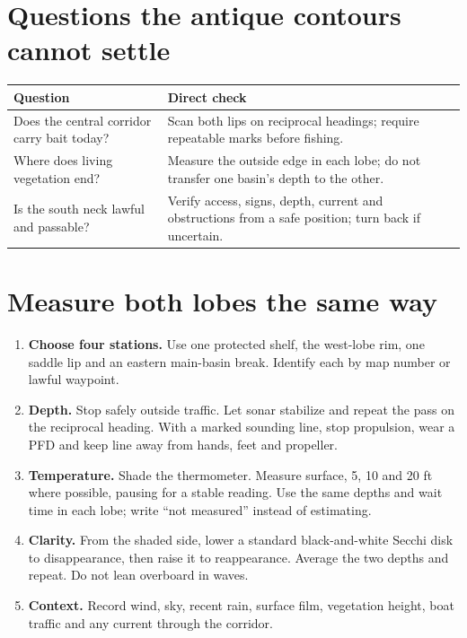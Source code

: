 \section{Questions the antique contours cannot settle}
\begin{tabularx}{\linewidth}{@{}X X@{}}
\toprule
\textbf{Question} & \textbf{Direct check}\\
\midrule
Does the central corridor carry bait today? & Scan both lips on reciprocal
headings; require repeatable marks before fishing.\\
Where does living vegetation end? & Measure the outside edge in each lobe;
do not transfer one basin's depth to the other.\\
Is the south neck lawful and passable? & Verify access, signs, depth, current
and obstructions from a safe position; turn back if uncertain.\\
\bottomrule
\end{tabularx}

\newpage
\section{Measure both lobes the same way}

\begin{enumerate}
\item \textbf{Choose four stations.} Use one protected shelf, the west-lobe
rim, one saddle lip and an eastern main-basin break. Identify each by map
number or lawful waypoint.
\item \textbf{Depth.} Stop safely outside traffic. Let sonar stabilize and
repeat the pass on the reciprocal heading. With a marked sounding line, stop
propulsion, wear a PFD and keep line away from hands, feet and propeller.
\item \textbf{Temperature.} Shade the thermometer. Measure surface, 5, 10 and
20 ft where possible, pausing for a stable reading. Use the same depths and
wait time in each lobe; write ``not measured'' instead of estimating.
\item \textbf{Clarity.} From the shaded side, lower a standard black-and-white
Secchi disk to disappearance, then raise it to reappearance. Average the two
depths and repeat. Do not lean overboard in waves.
\item \textbf{Context.} Record wind, sky, recent rain, surface film, vegetation
height, boat traffic and any current through the corridor.
\end{enumerate}

